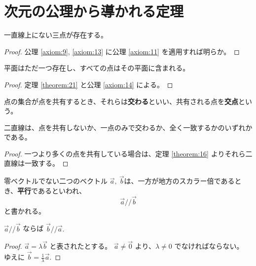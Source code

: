 \chapter{次元の公理から導かれる定理}

\begin{thm}\label{theorem:21}
  一直線上にない三点が存在する。
\end{thm}

\begin{proof}
  公理 \ref{axiom:9}, \ref{axiom:13} に公理 \ref{axiom:11} を適用すれば明らか。
\end{proof}

\begin{thm}\label{theorem:22}
  平面はただ一つ存在し、すべての点はその平面に含まれる。
\end{thm}

\begin{proof}
  定理 \ref{theorem:21} と公理 \ref{axiom:14} による。
\end{proof}

\begin{dfn}[交わる、交点]\label{definition:22}
  点の集合が点を共有するとき、それらは\textbf{交わる}といい、共有される点を\textbf{交点}という。
\end{dfn}

\begin{thm}\label{theorem:23}
  二直線は、点を共有しないか、一点のみで交わるか、全く一致するかのいずれかである。
\end{thm}

\begin{proof}
  一つより多くの点を共有している場合は、定理 \ref{theorem:16} よりそれら二直線は一致する。
\end{proof}

\begin{dfn}[ベクトルの平行]\label{definition:23}
  零ベクトルでない二つのベクトル \(\vec{a},\ \vec{b}\)は、一方が地方のスカラー倍であるとき、\textbf{平行}であるといわれ、
  \[\vec{a}/\!/\vec{b}\]
  と書かれる。
\end{dfn}

\begin{thm}\label{theorem:24}
  \(\vec{a}/\!/\vec{b}\) ならば \(\vec{b}/\!/\vec{a}.\)
\end{thm}

\begin{proof}
  \(\vec{a}=\lambda\vec{b}\) と表されたとする。
  \(\vec{a}\neq\vec{0}\) より、\(\lambda\neq0\) でなければならない。
  ゆえに \(\displaystyle \vec{b}=\frac{1}{\lambda}\vec{a}.\)
\end{proof}

